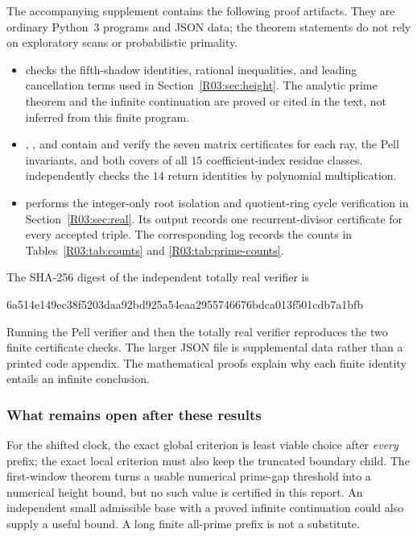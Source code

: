 \documentclass[11pt,a4paper]{article}
\theoremstyle{definition}\newtheorem{definition}[theorem]{Definition}
\theoremstyle{remark}\newtheorem{remark}[theorem]{Remark}
\begin{document}
The accompanying supplement contains the following proof artifacts.
They are ordinary Python~3 programs and JSON data; the theorem
statements do not rely on exploratory scans or probabilistic primality.
\begin{itemize}\raggedright
\item {} checks the fifth-shadow identities,
rational inequalities, and leading cancellation terms used in
Section~\ref{R03:sec:height}. The analytic prime theorem and the infinite
continuation are proved or cited in the text, not inferred from this
finite program.
\item {},
, and
 contain and verify the seven matrix
certificates for each ray, the Pell invariants, and both covers of
all $15$ coefficient-index residue classes.
 independently checks the
$14$ return identities by polynomial multiplication.
\item {} performs the integer-only
root isolation and quotient-ring cycle verification in
Section~\ref{R03:sec:real}. Its output
 records one recurrent-divisor
certificate for every accepted triple. The corresponding log records
the counts in Tables~\ref{R03:tab:counts} and \ref{R03:tab:prime-counts}.
\end{itemize}
The SHA-256 digest of the independent totally real verifier is
\begin{center}\small\ttfamily
6a514e149ec38f5203daa92bd925a54eaa2955746676bdca013f501cdb7a1bfb
\end{center}
Running the Pell verifier and then the totally real verifier reproduces
the two finite certificate checks. The larger JSON file is supplemental
data rather than a printed code appendix. The mathematical proofs
explain why each finite identity entails an infinite conclusion.

\subsubsection{What remains open after these results}

For the shifted clock, the exact global criterion is least viable
choice after \emph{every} prefix; the exact local criterion must also
keep the truncated boundary child. The first-window theorem turns
a usable numerical prime-gap threshold into a numerical height bound,
but no such value is certified in this report. An independent small
admissible base with a proved infinite continuation could also supply
a useful bound. A long finite all-prime prefix is not a substitute.
\end{document}

